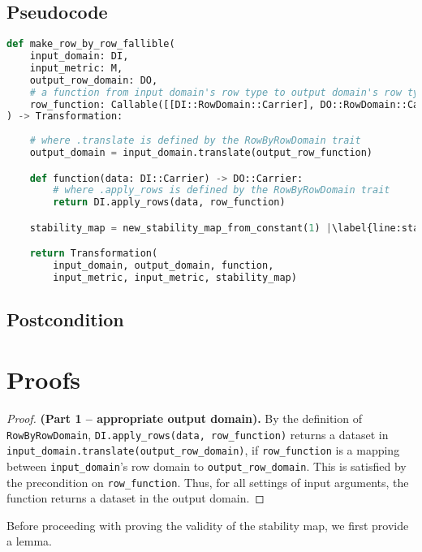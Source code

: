 \documentclass{article}
\begin{document}
\subsection*{Pseudocode}
\begin{lstlisting}[language = Python, escapechar=|]
def make_row_by_row_fallible(
    input_domain: DI, 
    input_metric: M, 
    output_row_domain: DO, 
    # a function from input domain's row type to output domain's row type
    row_function: Callable([[DI::RowDomain::Carrier], DO::RowDomain::Carrier])
) -> Transformation:
    
    # where .translate is defined by the RowByRowDomain trait
    output_domain = input_domain.translate(output_row_function)

    def function(data: DI::Carrier) -> DO::Carrier:
        # where .apply_rows is defined by the RowByRowDomain trait
        return DI.apply_rows(data, row_function)

    stability_map = new_stability_map_from_constant(1) |\label{line:stability-map}|

    return Transformation(
        input_domain, output_domain, function,
        input_metric, input_metric, stability_map)
\end{lstlisting}

\subsection*{Postcondition}

\section{Proofs}

\begin{proof} \textbf{(Part 1 -- appropriate output domain).}
    By the definition of \texttt{RowByRowDomain}, \texttt{DI.apply\_rows(data, row\_function)} returns a dataset in \texttt{input\_domain.translate(output\_row\_domain)},
    if \texttt{row\_function} is a mapping between \texttt{input\_domain}'s row domain to \texttt{output\_row\_domain}.
    This is satisfied by the precondition on \texttt{row\_function}.
    Thus, for all settings of input arguments, the function returns a dataset in the output domain.
\end{proof}

Before proceeding with proving the validity of the stability map, we first provide a lemma.
\end{document}
